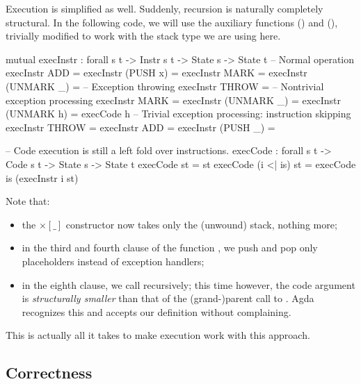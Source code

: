 Execution is simplified as well. Suddenly, recursion is naturally completely
structural. In the following code, we will use the auxiliary functions
 () and 
(), trivially modified to work with the stack type we
are using here.

\begin{codei}
  mutual
    execInstr : forall {s t} -> Instr s t -> State s -> State t
  	-- Normal operation
    execInstr ADD 					= \tick[ (x + y) \scons st ]
    execInstr (PUSH x)			\tick[ st ] 		= \tick[ x \scons st ]
    execInstr MARK				\tick[ st ] 		= 
    execInstr (UNMARK _)			= \tick[ x \scons st ]
    -- Exception throwing  
    execInstr THROW				\tick[ st ] =  
    -- Nontrivial exception processing
    execInstr MARK				\x[ n	 , st	] = \x[ suc n, st ]
    execInstr (UNMARK _)		\x[ suc n , st	] = \x[ n	, st ]
    execInstr (UNMARK h)		\x[ zero	 , st	] = execCode h \tick[ st ]
    -- Trivial exception processing: instruction skipping
    execInstr THROW			\x[ n , st ] = \x[ n , st ]
    execInstr ADD			\x[ n , st ] = \x[ n , st ]
    execInstr (PUSH _)		\x[ n , st ] = \x[ n , st ]
\end{codei}
\begin{code}
    -- Code execution is still a left fold over instructions.
    execCode : forall {s t} -> Code s t -> State s -> State t
    execCode \nil st = st
    execCode (i <| is) st = execCode is (execInstr i st)
\end{code}

\noindent Note that:
\begin{itemize}
	\item the $\times[\_]$ constructor now takes only the (unwound) stack, nothing more;
	\item in the third and fourth clause of the function ,
		we push and pop only placeholders instead of exception handlers;
	\item in the eighth clause, we call  recursively; this time however,
		the code argument  is \emph{structurally smaller} than that of
		the (grand-)parent call to . Agda recognizes this and
		accepts our definition without complaining.
\end{itemize}
This is actually all it takes to make execution work with this approach.

\subsection{Correctness}

